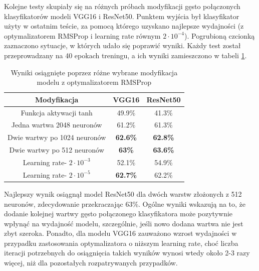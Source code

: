 Kolejne testy skupiały się na różnych próbach modyfikacji gęsto połączonych klasyfikatorów modeli VGG16 i ResNet50. Punktem wyjścia był klasyfikator użyty w ostatnim teście, za pomocą którego uzyskano najlepsze wydajności (z optymalizatorem RMSProp i learning rate równym $2\cdot10^{-4}$). Pogrubioną czcionką zaznaczono sytuacje, w których udało się poprawić wyniki. Każdy test został przeprowadzany na 40 epokach treningu, a ich wyniki zamieszczono w tabeli \ref{tab:5.14}.

\begin{table}[H]
  \centering
  \caption{Wyniki osiągnięte poprzez różne wybrane modyfikacja modelu z optymalizatorem RMSProp}
    \begin{tabular}{ |c|c|c| }
    \hline
    Modyfikacja & VGG16 & ResNet50 \\
    \hline
    Funkcja aktywacji tanh & 49.9\% & 41.3\% \\ 
    Jedna wartwa 2048 neuronów & 61.2\% & 61.3\% \\ 
    Dwie wartwy po 1024 neuronów & \textbf{62.6\%} & \textbf{62.8\%} \\ 
    Dwie wartwy po 512 neuronów & \textbf{63\%} & \textbf{63.6\%} \\
    Learning rate- $2\cdot10^{-3}$ & 52.1\% & 54.9\% \\
    Learning rate- $2\cdot10^{-5}$ & \textbf{62.7\%} & 62.2\% \\
    \hline
    \end{tabular}
  \label{tab:5.14}
\end{table}

Najlepszy wynik osiągnął model ResNet50 dla dwóch warstw złożonych z 512 neuronów, zdecydowanie przekraczając 63\%. Ogólne wyniki wskazują na to, że dodanie kolejnej wartwy gęsto połączonego klasyfikatora może pozytywnie wpłynąć na wydajność modelu, szczególnie, jeśli nowo dodana wartwa nie jest zbyt szeroka. Ponadto, dla modelu VGG16 zauważono wzrost wydajności w przypadku zastosowania optymalizatora o niższym learning rate, choć liczba iteracji potrzebnych do osiągnięcia takich wyników wynosi wtedy około 2-3 razy więcej, niż dla pozostałych rozpatrywanych przypadków.

